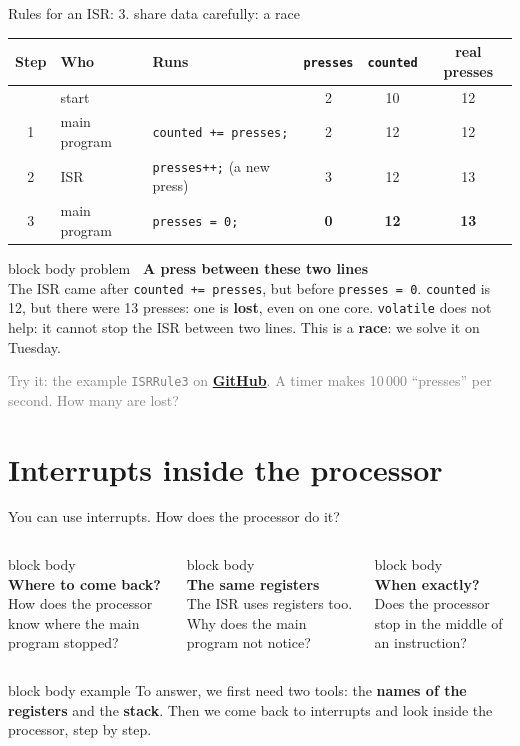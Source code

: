 \documentclass[aspectratio=169,10pt]{beamer}
\newcommand{\keymsg}[1]{%
  \begin{beamercolorbox}[rounded=true,sep=0.1cm,wd=\textwidth]{block body example}
    \centering\footnotesize #1
  \end{beamercolorbox}}
\newcommand{\qcard}[2]{%
  \begin{beamercolorbox}[rounded=true,sep=0.14cm,wd=\linewidth]{block body}
    \centering{\Large\textcolor{AccentOrange}{#1}}\\[0.12cm]
    \footnotesize #2
  \end{beamercolorbox}}
\newcommand{\probbox}[2]{%
  \begin{beamercolorbox}[rounded=true,sep=0.09cm,wd=\linewidth]{block body problem}
    \footnotesize\textbf{\textcolor{AccentOrange}{\faExclamationTriangle}\ #1}\\ #2
  \end{beamercolorbox}\vspace{0.06cm}}
\newcommand{\ghlink}[1]{\href{https://github.com/KsaweryM/Computer-Hardware-Course/tree/main/Lecture_6_A_Brief_History_of_Concurrency/#1}{\textcolor{DeepBlue}{\textbf{GitHub}}}}
\begin{document}
\begin{frame}[fragile]{Rules for an ISR: 3. share data carefully: a race}
  \begin{center}
    \footnotesize
    \renewcommand{\arraystretch}{1.25}
    \begin{tabular}{c l l c c c}
      \toprule
      \textbf{Step} & \textbf{Who} & \textbf{Runs} & \texttt{presses} & \texttt{counted} & \textbf{real presses} \\
      \midrule
      & start & & 2 & 10 & 12 \\
      \rowcolor{cWork!15}
      1 & main program & \texttt{counted += presses;} & 2 & 12 & 12 \\
      \rowcolor{cISR!18}
      2 & ISR & \texttt{presses++;} (a new press) & 3 & 12 & 13 \\
      \rowcolor{cWork!15}
      3 & main program & \texttt{presses = 0;} & \textcolor{MissRed}{\textbf{0}} & \textcolor{MissRed}{\textbf{12}} & \textcolor{MissRed}{\textbf{13}} \\
      \bottomrule
    \end{tabular}
  \end{center}
  \vfill
  \probbox{A press between these two lines}{The ISR came after \texttt{counted += presses}, but before
    \texttt{presses = 0}. \texttt{counted} is 12, but there were 13 presses: one is \textbf{lost}, even on one core.
    \texttt{volatile} does not help: it cannot stop the ISR between two lines. This is a \textbf{race}: we solve it on Tuesday.}
  {\scriptsize\textcolor{gray}{Try it: the example \texttt{ISRRule3} on \ghlink{ISRRule3}. A timer makes 10\,000
    ``presses'' per second. How many are lost?}\par}
  \vfill
\end{frame}

\section{Interrupts inside the processor}

\begin{frame}{You can use interrupts. How does the processor do it?}
  \begin{columns}[T,onlytextwidth]
      \qcard{\faMapMarker}{\textbf{Where to come back?}\\[3pt] How does the processor know where the main program stopped?}
      \qcard{\faMicrochip}{\textbf{The same registers}\\[3pt] The ISR uses registers too. Why does the main program not notice?}
      \qcard{\faStepForward}{\textbf{When exactly?}\\[3pt] Does the processor stop in the middle of an instruction?}
  \end{columns}
  \vfill
  \keymsg{To answer, we first need two tools: the \textbf{names of the registers} and the \textbf{stack}.
    Then we come back to interrupts and look inside the processor, step by step.}
\end{frame}
\end{document}
